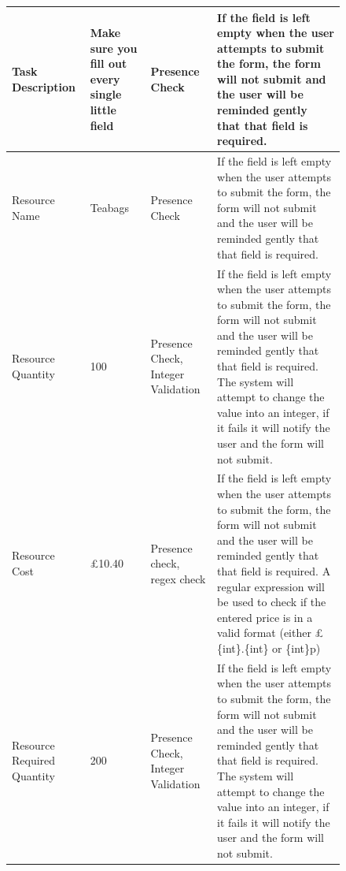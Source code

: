 \begin{figure}
\begin{table}[]
\begin{tabular}{llll}
\multicolumn{1}{|l|}{Task Description}           & \multicolumn{1}{l|}{Make sure you fill out every single little field} & \multicolumn{1}{l|}{Presence Check}                                          & \multicolumn{1}{l|}{If the field is left empty when the user attempts to submit the form, the form will not submit and the user will be reminded gently that that field is required.}                                                                                                                            \\ \hline
\multicolumn{1}{|l|}{Resource Name}              & \multicolumn{1}{l|}{Teabags}                                          & \multicolumn{1}{l|}{Presence Check}                                          & \multicolumn{1}{l|}{If the field is left empty when the user attempts to submit the form, the form will not submit and the user will be reminded gently that that field is required.}                                                                                                                            \\ \hline
Resource Quantity                                & 100                                                                   & Presence Check, Integer Validation                                           & If the field is left empty when the user attempts to submit the form, the form will not submit and the user will be reminded gently that that field is required. The system will attempt to change the value into an integer, if it fails it will notify the user and the form will not submit.                  \\
Resource Cost                                    & £10.40                                                                & Presence check, regex check                                                  & If the field is left empty when the user attempts to submit the form, the form will not submit and the user will be reminded gently that that field is required. A regular expression will be used to check if the entered price is in a valid format (either  £\{int\}.\{int\} or \{int\}p)                     \\
Resource Required Quantity                       & 200                                                                   & Presence Check, Integer Validation                                           & If the field is left empty when the user attempts to submit the form, the form will not submit and the user will be reminded gently that that field is required. The system will attempt to change the value into an integer, if it fails it will notify the user and the form will not submit.                  \\

\end{tabular}
\end{table}
\end{figure}
